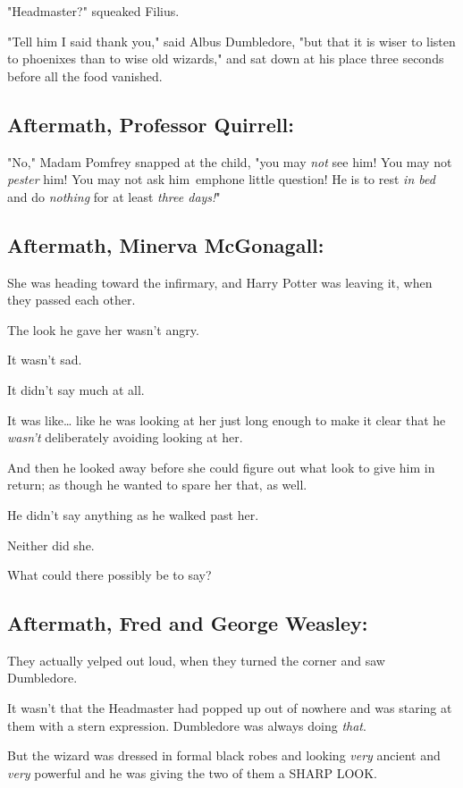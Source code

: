 "Headmaster?" squeaked Filius.

"Tell him I said thank you," said Albus Dumbledore, "but that it is wiser to 
listen to phoenixes than to wise old wizards," and sat down at his place three 
seconds before all the food vanished.
\sbreak
\subsection{Aftermath, Professor Quirrell:}

"No," Madam Pomfrey snapped at the child, "you may \emph{not} see him! You may 
not \emph{pester} him! You may not ask him\ emph{one little question!} He is to 
rest \emph{in bed} and do \emph{nothing} for at least \emph{three days!}"
\sbreak
\subsection{Aftermath, Minerva McGonagall:}

She was heading toward the infirmary, and Harry Potter was leaving it, when 
they passed each other.

The look he gave her wasn't angry.

It wasn't sad.

It didn't say much at all.

It was like{\ldots} like he was looking at her just long enough to make it 
clear that he \emph{wasn't} deliberately avoiding looking at her.

And then he looked away before she could figure out what look to give him in 
return; as though he wanted to spare her that, as well.

He didn't say anything as he walked past her.

Neither did she.

What could there possibly be to say?
\sbreak
\subsection{Aftermath, Fred and George Weasley:}

They actually yelped out loud, when they turned the corner and saw Dumbledore.

It wasn't that the Headmaster had popped up out of nowhere and was staring at 
them with a stern expression. Dumbledore was always doing \emph{that}.

But the wizard was dressed in formal black robes and looking \emph{very} 
ancient and \emph{very} powerful and he was giving the two of them a SHARP LOOK.

